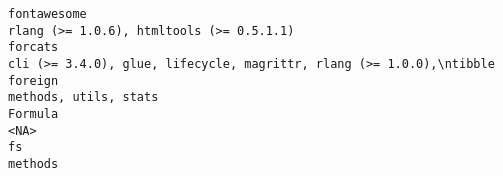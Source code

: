 \documentclass[
  letterpaper,
  DIV=11,
  numbers=noendperiod]{scrreprt}
\begin{document}
\begin{verbatim}
fontawesome                                                                                                                                                                                                                                                                                                                                                                                                                                                                                                                                                                       rlang (>= 1.0.6), htmltools (>= 0.5.1.1)
forcats                                                                                                                                                                                                                                                                                                                                                                                                                                                                                                                                               cli (>= 3.4.0), glue, lifecycle, magrittr, rlang (>= 1.0.0),\ntibble
foreign                                                                                                                                                                                                                                                                                                                                                                                                                                                                                                                                                                                              methods, utils, stats
Formula                                                                                                                                                                                                                                                                                                                                                                                                                                                                                                                                                                                                               <NA>
fs                                                                                                                                                                                                                                                                                                                                                                                                                                                                                                                                                                                                                 methods

\end{verbatim}
\end{document}
